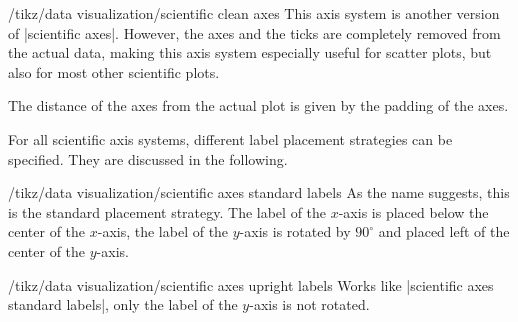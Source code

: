 \begin{key}{/tikz/data visualization/scientific clean axes}
  This axis system is another version of |scientific axes|. However, the
  axes and the ticks are completely removed from the actual data,
  making this axis system especially useful for scatter plots, but
  also for most other scientific plots.

\begin{codeexample}[]
\end{codeexample}

  The distance of the axes from the actual plot is given by the
  padding of the axes.
\end{key}


For all scientific axis systems, different label placement strategies
can be specified. They are discussed in the following.


\begin{key}{/tikz/data visualization/scientific axes standard labels}
  As the name suggests, this is the standard placement strategy. The
  label of the $x$-axis is placed below the center of the $x$-axis,
  the label of the $y$-axis is rotated by $90^\circ$ and placed left
  of the center of the $y$-axis.
\begin{codeexample}[]
\end{codeexample}
\end{key}

\begin{key}{/tikz/data visualization/scientific axes upright labels}
  Works like |scientific axes standard labels|, only the label of the
  $y$-axis is not rotated.
\begin{codeexample}[]
\end{codeexample}
\end{key}


